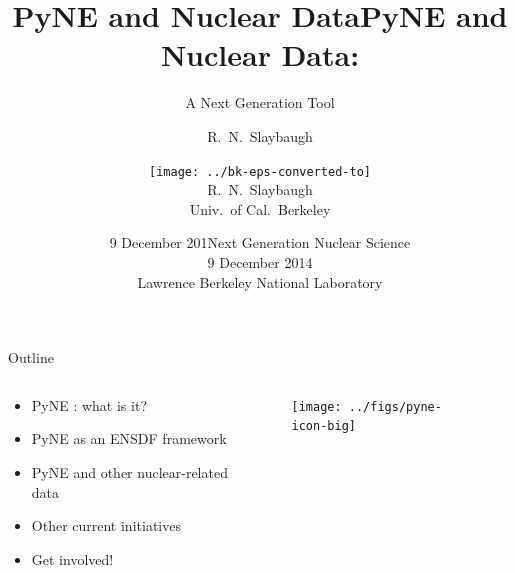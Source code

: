 \documentclass[xcolor=x11names,compress]{beamer}
\title{PyNE and Nuclear Data}
\author{R.\ N.\ Slaybaugh}
\date{9 December 201}
\renewcommand{\(}{\begin{columns}}
\renewcommand{\)}{\end{columns}}
\newcommand{\<}[1]{\begin{column}{#1}}
\renewcommand{\>}{\end{column}}
\begin{document}
\begin{frame}
\title{PyNE and Nuclear Data:}
\subtitle{A Next Generation Tool}
\author{
\texttt{[image: ../bk-eps-converted-to]}\\R.\ N.\ Slaybaugh \\ Univ.\ of Cal.\ Berkeley}

\date{Next Generation Nuclear Science\\ 9 December 2014\\ Lawrence Berkeley National Laboratory}
\titlepage
\end{frame}

\begin{frame}{Outline}

	\begin{columns}
  	\begin{column}{0.5\textwidth}
	    \begin{itemize}
          \item PyNE \cite{pyne}: what is it?
          \item PyNE as an ENSDF framework
          \item PyNE and other nuclear-related data
          \item Other current initiatives
          \item Get involved!
	    \end{itemize}
  	\end{column}
 	\begin{column}{0.4\textwidth}
 	   \begin{center}
 	   \begin{figure}
       \texttt{[image: ../figs/pyne-icon-big]}
	   \end{figure}
 	   \end{center}
  	\end{column}
	\end{columns}

\end{frame}

\end{document}
